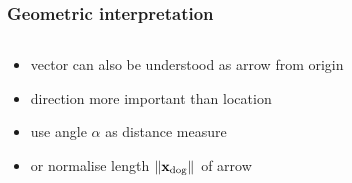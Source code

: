 \documentclass[t]{beamer} %
\begin{document}
\begin{frame}
  \frametitle{Geometric interpretation}

  \begin{columns}[T]
    \begin{column}{40mm}
      \begin{itemize}
      \item vector can also be understood as arrow from origin
      \item direction more important than location
      \item<1-> use angle $\alpha$ as distance measure
      \item<2-> or normalise length $\norm{\vx_{\text{dog}}}$ of arrow
      \end{itemize}
    \end{column}
    \begin{column}{75mm}
      \ungap[1]
    \end{column}
  \end{columns}
\end{frame}
\end{document}
